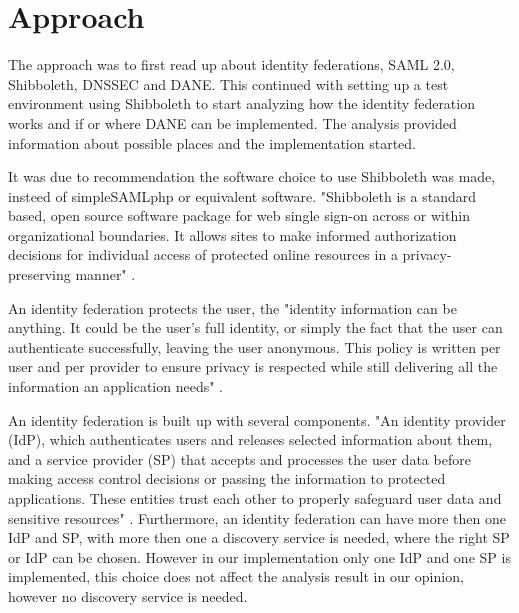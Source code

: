 \section{Approach}

The approach was to first read up about identity federations, SAML 2.0, Shibboleth, DNSSEC and DANE. 
This continued with setting up a test environment using Shibboleth to start analyzing how the identity federation works and if or where DANE can be implemented. 
The analysis provided information about possible places and the implementation started.  

It was due to recommendation the software choice to use Shibboleth was made, insteed of simpleSAMLphp or equivalent software. 
"Shibboleth is a standard based, open source software package for web single sign-on across or within organizational boundaries. 
It allows sites to make informed authorization decisions for individual access of protected online resources in a privacy-preserving manner" \cite{website:Shibboleth}.

An identity federation protects the user, the "identity information can be anything. 
It could be the user's full identity, or simply the fact that the user can authenticate successfully, leaving the user anonymous. 
This policy is written per user and per provider to ensure privacy is respected while still delivering all the information an application needs" \cite{website:ShibbolethHighLevelIntro}.

An identity federation is built up with several components. 
"An identity provider (IdP), which authenticates users and releases selected information about them, and a service provider (SP) that accepts and processes the user data before making access control decisions or passing the information to protected applications. 
These entities trust each other to properly safeguard user data and sensitive resources" \cite{website:Shibboleth}. 
Furthermore,  an identity federation can have more then one IdP and SP, with more then one a discovery service is needed, where the right SP or IdP can be chosen.
However in our implementation only one IdP and one SP is implemented, this choice does not affect the analysis result in our opinion, however no discovery service is needed. 




